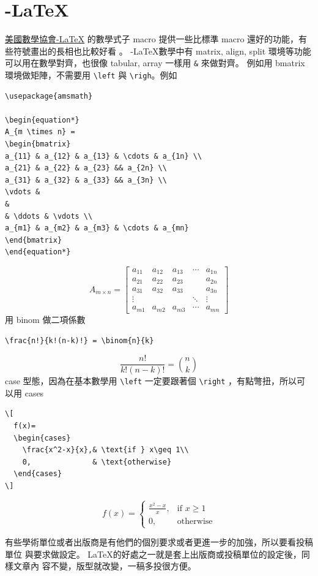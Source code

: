\section{\AmS-\LaTeX}
\href{https://www.ams.org/arc/tex/amsmath/amsldoc.pdf}{美國數學協會\AmS-\LaTeX}
的數學式子 macro 提供一些比標準 macro 還好的功能，有些符號畫出的長相也比較好看
。 \AmS-\LaTeX 數學中有 matrix, align, split 環境等功能可以用在數學對齊，也很像
tabular, array 一樣用 \verb=&= 來做對齊。 例如用 bmatrix 環境做矩陣，不需要用
\verb=\left= 與 \verb=\righ=。例如
\begin{verbatim}
\usepackage{amsmath}

\begin{equation*}
A_{m \times n} =
\begin{bmatrix}
a_{11} & a_{12} & a_{13} & \cdots & a_{1n} \\
a_{21} & a_{22} & a_{23} && a_{2n} \\
a_{31} & a_{32} & a_{33} && a_{3n} \\
\vdots &
&
& \ddots & \vdots \\
a_{m1} & a_{m2} & a_{m3} & \cdots & a_{mn}
\end{bmatrix}
\end{equation*}
\end{verbatim}
\begin{equation*}
A_{m \times n} =
\begin{bmatrix}
a_{11} & a_{12} & a_{13} & \cdots & a_{1n} \\
a_{21} & a_{22} & a_{23} && a_{2n} \\
a_{31} & a_{32} & a_{33} && a_{3n} \\
\vdots &
&
& \ddots & \vdots \\
a_{m1} & a_{m2} & a_{m3} & \cdots & a_{mn}
\end{bmatrix}
\end{equation*}
用 binom 做二項係數
\begin{verbatim}
\frac{n!}{k!(n-k)!} = \binom{n}{k}
\end{verbatim}
\[
  \frac{n!}{k!(n-k)!} = \binom{n}{k}
\]
case 型態，因為在基本數學用 \verb=\left= 一定要跟著個 \verb=\right=
，有點彆扭，所以可以用 cases
\begin{verbatim}
\[
  f(x)=
  \begin{cases}
    \frac{x^2-x}{x},& \text{if } x\geq 1\\
    0,              & \text{otherwise}
  \end{cases}
\]
\end{verbatim}
\[
  f(x)=
  \begin{cases}
    \frac{x^2-x}{x},& \text{if } x\geq 1\\
    0,              & \text{otherwise}
  \end{cases}
\]

有些學術單位或者出版商是有他們的個別要求或者更進一步的加強，所以要看投稿單位
與要求做設定。 \LaTeX 的好處之一就是套上出版商或投稿單位的設定後，同樣文章內
容不變，版型就改變，一稿多投很方便。
